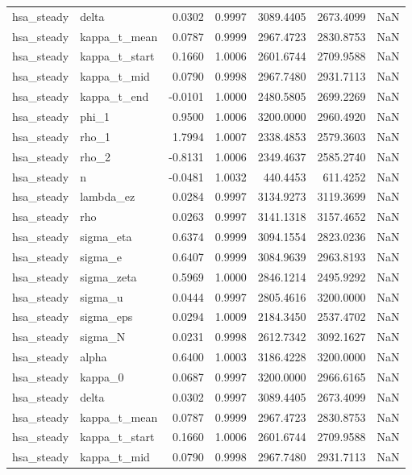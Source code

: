 \begin{tabular}{llrrrrl}
hsa\_steady & delta & 0.0302 & 0.9997 & 3089.4405 & 2673.4099 & NaN \\
hsa\_steady & kappa\_t\_mean & 0.0787 & 0.9999 & 2967.4723 & 2830.8753 & NaN \\
hsa\_steady & kappa\_t\_start & 0.1660 & 1.0006 & 2601.6744 & 2709.9588 & NaN \\
hsa\_steady & kappa\_t\_mid & 0.0790 & 0.9998 & 2967.7480 & 2931.7113 & NaN \\
hsa\_steady & kappa\_t\_end & -0.0101 & 1.0000 & 2480.5805 & 2699.2269 & NaN \\
hsa\_steady & phi\_1 & 0.9500 & 1.0006 & 3200.0000 & 2960.4920 & NaN \\
hsa\_steady & rho\_1 & 1.7994 & 1.0007 & 2338.4853 & 2579.3603 & NaN \\
hsa\_steady & rho\_2 & -0.8131 & 1.0006 & 2349.4637 & 2585.2740 & NaN \\
hsa\_steady & n & -0.0481 & 1.0032 & 440.4453 & 611.4252 & NaN \\
hsa\_steady & lambda\_ez & 0.0284 & 0.9997 & 3134.9273 & 3119.3699 & NaN \\
hsa\_steady & rho & 0.0263 & 0.9997 & 3141.1318 & 3157.4652 & NaN \\
hsa\_steady & sigma\_eta & 0.6374 & 0.9999 & 3094.1554 & 2823.0236 & NaN \\
hsa\_steady & sigma\_e & 0.6407 & 0.9999 & 3084.9639 & 2963.8193 & NaN \\
hsa\_steady & sigma\_zeta & 0.5969 & 1.0000 & 2846.1214 & 2495.9292 & NaN \\
hsa\_steady & sigma\_u & 0.0444 & 0.9997 & 2805.4616 & 3200.0000 & NaN \\
hsa\_steady & sigma\_eps & 0.0294 & 1.0009 & 2184.3450 & 2537.4702 & NaN \\
hsa\_steady & sigma\_N & 0.0231 & 0.9998 & 2612.7342 & 3092.1627 & NaN \\
hsa\_steady & alpha & 0.6400 & 1.0003 & 3186.4228 & 3200.0000 & NaN \\
hsa\_steady & kappa\_0 & 0.0687 & 0.9997 & 3200.0000 & 2966.6165 & NaN \\
hsa\_steady & delta & 0.0302 & 0.9997 & 3089.4405 & 2673.4099 & NaN \\
hsa\_steady & kappa\_t\_mean & 0.0787 & 0.9999 & 2967.4723 & 2830.8753 & NaN \\
hsa\_steady & kappa\_t\_start & 0.1660 & 1.0006 & 2601.6744 & 2709.9588 & NaN \\
hsa\_steady & kappa\_t\_mid & 0.0790 & 0.9998 & 2967.7480 & 2931.7113 & NaN \\

\end{tabular}
